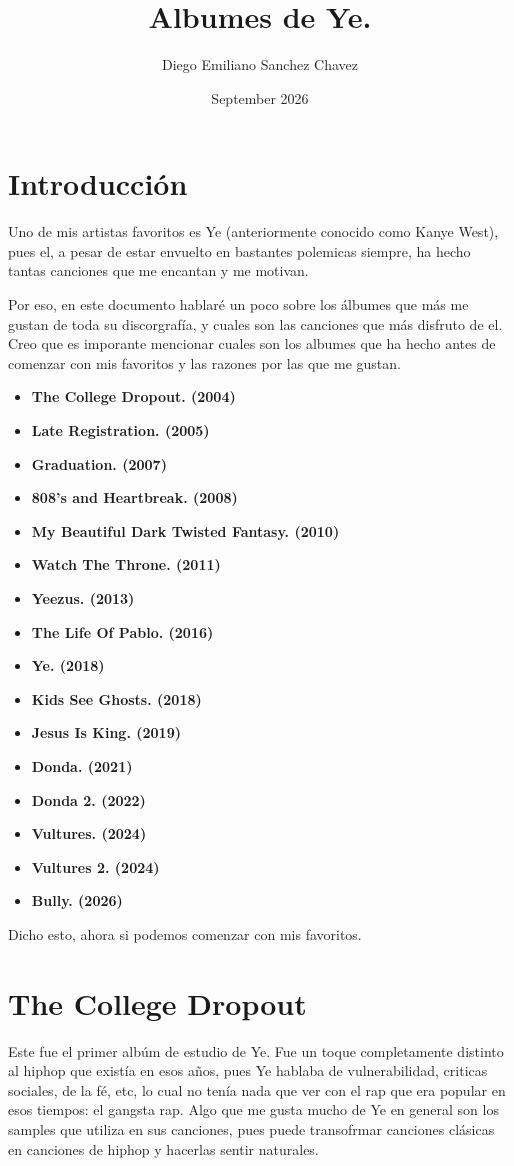 \documentclass{article}
\title{Albumes de Ye.}
\author{Diego Emiliano Sanchez Chavez}
\date{September 2026}
\begin{document}
\maketitle

\section*{Introducción}
Uno de mis artistas favoritos es Ye (anteriormente conocido como Kanye West), pues el, a pesar de estar envuelto en bastantes polemicas siempre, ha hecho tantas canciones que me encantan y me motivan. 

Por eso, en este documento hablaré un poco sobre los álbumes que más me gustan de toda su discorgrafía, y cuales son las canciones que más disfruto de el.
Creo que es imporante mencionar cuales son los albumes que ha hecho antes de comenzar con mis favoritos y las razones por las que me gustan.
\begin{itemize}
    \item \textbf{The College Dropout. (2004)}
    \item \textbf{Late Registration. (2005)}
    \item \textbf{Graduation. (2007)}
    \item \textbf{808's and Heartbreak. (2008)}
    \item \textbf{My Beautiful Dark Twisted Fantasy. (2010)}
    \item \textbf{Watch The Throne. (2011)}
    \item \textbf{Yeezus. (2013)}
    \item \textbf{The Life Of Pablo. (2016)}
    \item \textbf{Ye. (2018)}
    \item \textbf{Kids See Ghosts. (2018)}
    \item \textbf{Jesus Is King. (2019)}
    \item \textbf{Donda. (2021)}
    \item \textbf{Donda 2. (2022)}
    \item \textbf{Vultures. (2024)}
    \item \textbf{Vultures 2. (2024)}
    \item \textbf{Bully. (2026)}

    \end{itemize}
    
    Dicho esto, ahora si podemos comenzar con mis favoritos.
    \section*{The College Dropout}
    Este fue el primer albúm de estudio de Ye. Fue un toque completamente distinto al hiphop que existía en esos años, pues Ye hablaba de vulnerabilidad, criticas sociales, de la fé, etc, lo cual no tenía nada que ver con el rap que era popular en esos tiempos: el gangsta rap.
    Algo que me gusta mucho de Ye en general son los samples que utiliza en sus canciones, pues puede transofrmar canciones clásicas en canciones de hiphop y hacerlas sentir naturales.
\end{document}
